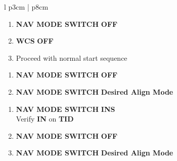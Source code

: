 \documentclass[fontHelvetica]{TechCheck}
\begin{document}
\begin{center}
\begin{longtable}{l p{3cm} | p{8cm}}
			\begin{minipage}[t]{\linewidth}
				\begin{enumerate}
					\item \textbf{NAV MODE SWITCH} \dotfill \textbf{OFF}
					\item \textbf{WCS} \dotfill \textbf{OFF}
					\item Proceed with normal start sequence
				\end{enumerate}
				\begin{enumerate}
					\item \textbf{NAV MODE SWITCH} \dotfill \textbf{OFF}
					\item \textbf{NAV MODE SWITCH} \dotfill \textbf{Desired Align Mode}
				\end{enumerate}
				\begin{enumerate}
					\item \textbf{NAV MODE SWITCH} \dotfill \textbf{INS} \\
					\hfill Verify \textbf{IN} on \textbf{TID}
					\item \textbf{NAV MODE SWITCH} \dotfill \textbf{OFF}
					\item \textbf{NAV MODE SWITCH} \dotfill \textbf{Desired Align Mode}
				\end{enumerate}
			\end{minipage} \\
			\bottomrule
		\end{longtable}
	\end{center}

\end{document}
